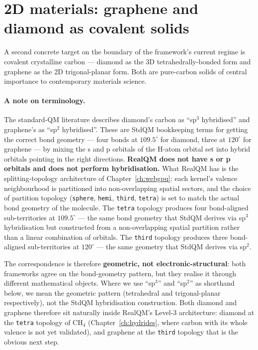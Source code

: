 \section{2D materials: graphene and diamond as covalent solids}\label{sec:graphene}

A second concrete target on the boundary of the framework's current regime is covalent crystalline carbon --- diamond as the 3D tetrahedrally-bonded form and graphene as the 2D trigonal-planar form. Both are pure-carbon solids of central importance to contemporary materials science.

\paragraph{A note on terminology.}
The standard-QM literature describes diamond's carbon as ``sp$^3$ hybridised'' and graphene's as ``sp$^2$ hybridised''. These are StdQM bookkeeping terms for getting the correct bond geometry --- four bonds at $109.5^\circ$ for diamond, three at $120^\circ$ for graphene --- by mixing the s and p orbitals of the H-atom orbital set into hybrid orbitals pointing in the right directions. \textbf{RealQM does not have s or p orbitals and does not perform hybridisation.} What RealQM has is the splitting-topology architecture of Chapter~\ref{ch:webgpu}: each kernel's valence neighbourhood is partitioned into non-overlapping spatial sectors, and the choice of partition topology (\texttt{sphere}, \texttt{hemi}, \texttt{third}, \texttt{tetra}) is set to match the actual bond geometry of the molecule. The \texttt{tetra} topology produces four bond-aligned sub-territories at $109.5^\circ$ --- the same bond geometry that StdQM derives via sp$^3$ hybridisation but constructed from a non-overlapping spatial partition rather than a linear combination of orbitals. The \texttt{third} topology produces three bond-aligned sub-territories at $120^\circ$ --- the same geometry that StdQM derives via sp$^2$.

The correspondence is therefore \textbf{geometric, not electronic-structural}: both frameworks agree on the bond-geometry pattern, but they realise it through different mathematical objects. Where we use ``sp$^3$'' and ``sp$^2$'' as shorthand below, we mean the geometric pattern (tetrahedral and trigonal-planar respectively), not the StdQM hybridisation construction. Both diamond and graphene therefore sit naturally inside RealQM's Level-3 architecture: diamond at the \texttt{tetra} topology of CH$_4$ (Chapter~\ref{ch:hydrides}, where carbon with its whole valence is not yet validated), and graphene at the \texttt{third} topology that is the obvious next step.


